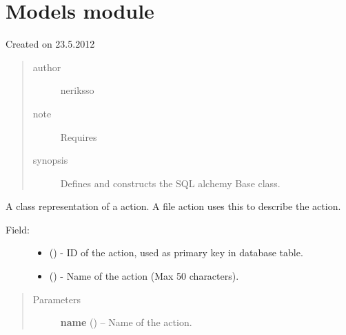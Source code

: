 \documentclass[letterpaper,10pt,english]{sphinxmanual}
\begin{document}
\section{Models module}
\label{models:module-models}\label{models::doc}\label{models:models-module}
Created on 23.5.2012
\begin{quote}\begin{description}
\item[{author}] \leavevmode
neriksso

\item[{note}] \leavevmode
Requires 

\item[{synopsis}] \leavevmode
Defines and constructs the SQL alchemy Base class.

\end{description}\end{quote}

\begin{fulllineitems}
\label{models:models.Action}
A class representation of a action. A file action uses this to describe
the action.
\begin{description}
\item[{Field:}] \leavevmode\begin{itemize}
\item {} 
        ()        - ID of the action, used as primary key in database table.

\item {} 
        ()        - Name of the action (Max 50 characters).

\end{itemize}

\end{description}
\begin{quote}\begin{description}
\item[{Parameters}] \leavevmode
\textbf{name} () -- Name of the action.

\end{description}\end{quote}

\end{fulllineitems}

\end{document}
